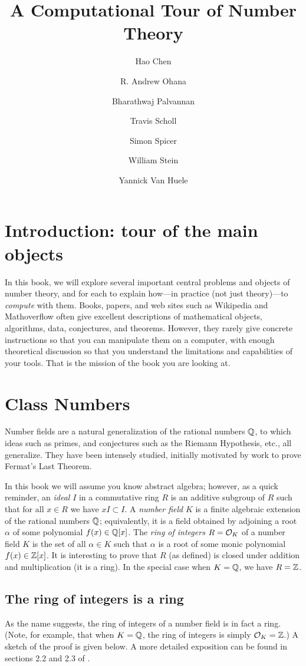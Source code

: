 \documentclass{book}
\title{A Computational Tour of Number Theory}
\author{Hao Chen \and R. Andrew Ohana \and Bharathwaj Palvannan
\and Travis Scholl
\and Simon Spicer \and William Stein \and
\and Yannick Van Huele}
\begin{document}
\maketitle
\tableofcontents

\chapter{Introduction: tour of the main objects}
In this book, we will explore several important central problems and
objects of number theory, and for each to explain how---in practice
(not just theory)---to {\em compute} with them.    Books,
papers, and web sites such as Wikipedia and Mathoverflow often
give excellent descriptions
of mathematical objects, algorithms, data, conjectures, and theorems.
However, they rarely give concrete instructions
so that you can manipulate them on a computer, with enough theoretical
discussion so that you understand the limitations and capabilities of
your tools.  That is the mission of the book you are looking at.





\chapter{Class Numbers}
Number fields are a natural generalization of the rational numbers $\mathbb{Q}$,
to which ideas such as primes, and conjectures such as
the Riemann Hypothesis, etc., all generalize.  They have
been intensely studied, initially motivated by
work to prove Fermat's Last Theorem.

In this book we will assume you know abstract algebra; however,
as a quick reminder, an {\em ideal} $I$ in a commutative ring $R$ is an
additive subgroup of $R$ such that for all $x\in R$ we have $xI \subset I$.
A {\em number field} $K$ is a finite algebraic extension of
the rational numbers $\mathbb{Q}$; equivalently, it is a field obtained
by adjoining a root $\alpha$ of some polynomial $f(x) \in \mathbb{Q}[x]$.
The {\em ring of integers} $R=\mathcal{O}_K$ of a number field $K$ is the
set of all $\alpha\in K$ such that $\alpha$ is a root of some
monic polynomial $f(x)\in\mathbb{Z}[x]$.  It is interesting to prove
that $R$ (as defined) is closed under addition and multiplication
(it is a ring).
In the special case when $K=\mathbb{Q}$, we have $R=\mathbb{Z}$.

\section{The ring of integers is a ring}
As the name suggests, the ring
of integers of a number field is in fact a ring.
(Note, for example, that when $K = \mathbb{Q}$, the ring of integers is simply
$\mathcal{O}_K = \mathbb{Z}$.)
A sketch of the proof is given below.
A more detailed
exposition can be found in sections 2.2 and 2.3 of \cite{stein:ant}.
\end{document}
